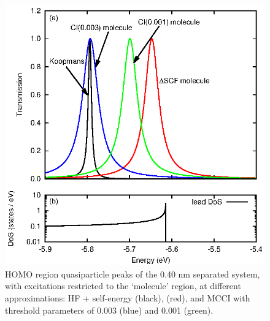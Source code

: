 \begin{figure}
	\begin{center}
		\includegraphics[width=0.9\linewidth]{figures/figure6a_6b}
	\end{center}
	\caption{HOMO region quasiparticle peaks of the 0.40 nm separated
	         system, with excitations restricted to the `molecule' region,
		 at different approximations: HF + self-energy (black),
		 \dscf (red), and MCCI with threshold parameters of
		 0.003 (blue) and 0.001 (green).}
	\label{fig:all40Ahomo}
\end{figure}

